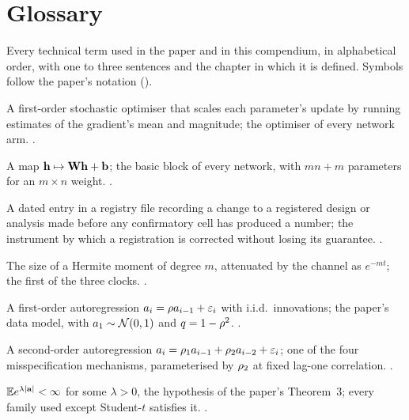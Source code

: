 \chapter{Glossary}
\label{ch:glossary}

Every technical term used in the paper and in this compendium, in alphabetical order,
with one to three sentences and the chapter in which it is defined. Symbols follow the
paper's notation ().

\begingroup\sloppy
\begin{description}[leftmargin=1.6em,itemsep=0.25em,font=\normalfont\bfseries]

\item[Adam] A first-order stochastic optimiser that scales each parameter's update by
running estimates of the gradient's mean and magnitude; the optimiser of every network
arm. .

\item[Affine layer] A map $\mathbf{h}\mapsto\mathbf{W}\mathbf{h}+\mathbf{b}$; the basic block of every
network, with $mn+m$ parameters for an $m\times n$ weight. .

\item[Amendment, pre-data] A dated entry in a registry file recording a change to a
registered design or analysis made before any confirmatory cell has produced a number;
the instrument by which a registration is corrected without losing its guarantee.
.

\item[Amplitude (of a feature)] The size of a Hermite moment of degree $m$, attenuated by
the channel as $e^{-mt}$; the first of the three clocks. .

\item[AR(1) chain] A first-order autoregression $a_i=\rho a_{i-1}+\varepsilon_i$ with
i.i.d.\ innovations; the paper's data model, with $a_1\sim\mathcal{N}\!\left(0,1\right)$ and
$q=1-\rho^2$. .

\item[AR(2)] A second-order autoregression $a_i=\rho_1a_{i-1}+\rho_2a_{i-2}+\varepsilon_i$;
one of the four misspecification mechanisms, parameterised by $\rho_2$ at fixed lag-one
correlation. .

\item[Assumption (exponential moment)] $\mathbb{E} e^{\lambda|\mathbf{a}|}<\infty$ for some $\lambda>0$,
the hypothesis of the paper's Theorem~3; every family used except Student-$t$ satisfies
it. .


\end{description}
